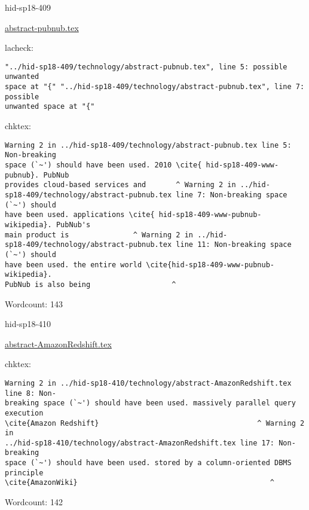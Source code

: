 \begin{IU}

hid-sp18-409

\href{https://github.com/cloudmesh-community/hid-sp18-409/blob/master//technology/abstract-pubnub.tex}{abstract-pubnub.tex}

 
lacheck:
\begin{tiny}
\begin{verbatim}
"../hid-sp18-409/technology/abstract-pubnub.tex", line 5: possible unwanted
space at "{" "../hid-sp18-409/technology/abstract-pubnub.tex", line 7: possible
unwanted space at "{"
\end{verbatim}
\end{tiny}
chktex:
\begin{tiny}
\begin{verbatim}
Warning 2 in ../hid-sp18-409/technology/abstract-pubnub.tex line 5: Non-breaking
space (`~') should have been used. 2010 \cite{ hid-sp18-409-www-pubnub}. PubNub
provides cloud-based services and       ^ Warning 2 in ../hid-
sp18-409/technology/abstract-pubnub.tex line 7: Non-breaking space (`~') should
have been used. applications \cite{ hid-sp18-409-www-pubnub-wikipedia}. PubNub's
main product is               ^ Warning 2 in ../hid-
sp18-409/technology/abstract-pubnub.tex line 11: Non-breaking space (`~') should
have been used. the entire world \cite{hid-sp18-409-www-pubnub-wikipedia}.
PubNub is also being                   ^
\end{verbatim}
\end{tiny}

Wordcount: 143

\end{IU}



\begin{IU}

hid-sp18-410

\href{https://github.com/cloudmesh-community/hid-sp18-410/blob/master//technology/abstract-AmazonRedshift.tex}{abstract-AmazonRedshift.tex}

 
chktex:
\begin{tiny}
\begin{verbatim}
Warning 2 in ../hid-sp18-410/technology/abstract-AmazonRedshift.tex line 8: Non-
breaking space (`~') should have been used. massively parallel query execution
\cite{Amazon Redshift}                                     ^ Warning 2 in
../hid-sp18-410/technology/abstract-AmazonRedshift.tex line 17: Non-breaking
space (`~') should have been used. stored by a column-oriented DBMS principle
\cite{AmazonWiki}                                             ^
\end{verbatim}
\end{tiny}

Wordcount: 142

\end{IU}

